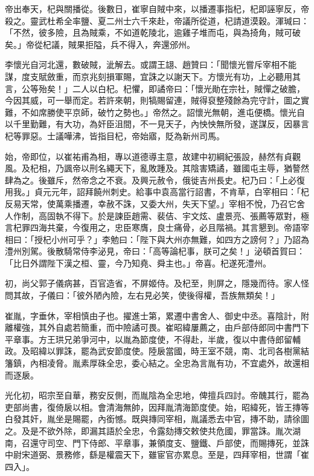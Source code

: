 \begin{pinyinscope}
 帝出奉天，杞與關播從。後數日，崔寧自賊中來，以播遷事指杞，杞即誣寧反，帝殺之。靈武杜希全率鹽、夏二州士六千來赴，帝議所從道，杞請道漠穀。渾瑊曰：「不然，彼多險，且為賊乘，不如道乾陵北，逾雞子堆而屯，與為掎角，賊可破矣。」帝從杞議，賊果拒隘，兵不得入，奔還邠州。



 李懷光自河北還，數破賊，泚解去。或謂王翃、趙贊曰：「聞懷光嘗斥宰相不能謀，度支賦斂重，而京兆刻損軍賜，宜誅之以謝天下。方懷光有功，上必聽用其言，公等殆矣！」二人以白杞。杞懼，即譎帝曰：「懷光勛在宗社，賊憚之破膽，今因其威，可一舉而定。若許來朝，則犒賜留連，賊得裒整殘餘為完守計，圖之實難，不如席勝使平京師，破竹之勢也。」帝然之。詔懷光無朝，進屯便橋。懷光自以千里勤難，有大功，為奸臣沮間，不一見天子，內怏怏無所發，遂謀反，因暴言杞等罪惡。士議嘩沸，皆指目杞，帝始寤，貶為新州司馬。



 始，帝即位，以崔祐甫為相，專以道德導主意，故建中初綱紀張設，赫然有貞觀風。及杞相，乃諷帝以刑名繩天下，亂敗踵及。其陰害矯譎，雖國屯主辱，猶謷然肆為之。後雖斥，然帝念之不衰。及興元赦令，俄徙吉州長史。杞乃曰：「上必復用我。」貞元元年，詔拜饒州刺史。給事中袁高當行詔書，不肯草，白宰相曰：「杞反易天常，使萬乘播遷，幸赦不誅，又委大州，失天下望。」宰相不悅，乃召它舍人作制，高固執不得下。於是諫臣趙需、裴佶、宇文炫、盧景亮、張薦等眾對，極言杞罪四海共棄，今復用之，忠臣寒膺，良士痛骨，必且階禍。其言懇到。帝語宰相曰：「授杞小州可乎？」李勉曰：「陛下與大州亦無難，如四方之謗何？」乃詔為澧州別駕。後散騎常侍李泌見，帝曰：「高等論杞事，朕可之矣！」泌頓首賀曰：「比日外謂陛下漢之桓、靈，今乃知堯、舜主也。」帝喜。杞遂死澧州。



 初，尚父郭子儀病甚，百官造省，不屏姬侍。及杞至，則屏之，隱幾而待。家人怪問其故，子儀曰：「彼外陋內險，左右見必笑，使後得權，吾族無類矣！」



 崔胤，字垂休，宰相慎由子也。擢進士第，累遷中書舍人、御史中丞。喜陰計，附離權強，其外自處若簡重，而中險譎可畏。崔昭緯屢薦之，由戶部侍郎同中書門下平章事。方王珙兄弟爭河中，以胤為節度使，不得赴，半歲，復以中書侍郎留輔政。及昭緯以罪誅，罷為武安節度使。陸扆當國，時王室不競，南、北司各樹黨結籓鎮，內相凌脅。胤素厚硃全忠，委心結之。全忠為言胤有功，不宜處外，故還相而逐扆。



 光化初，昭宗至自華，務安反側，而胤陰為全忠地，俾擅兵四討。帝醜其行，罷為吏部尚書，復倚扆以相。會清海無帥，因拜胤清海節度使。始，昭緯死，皆王摶等白發其奸，胤坐是賜罷，內銜憾。既與摶同宰相，胤議悉去中官，摶不助，請徐圖之。及是不欲外除，即漏其語於全忠，令露劾摶交敕使共危國，罪當誅。胤次湖南，召還守司空、門下侍郎、平章事，兼領度支、鹽鐵、戶部使，而賜摶死，並誅中尉宋道弼、景務修，繇是權震天下，雖宦官亦累息。至是，四拜宰相，世謂「崔四入」。




\end{pinyinscope}
